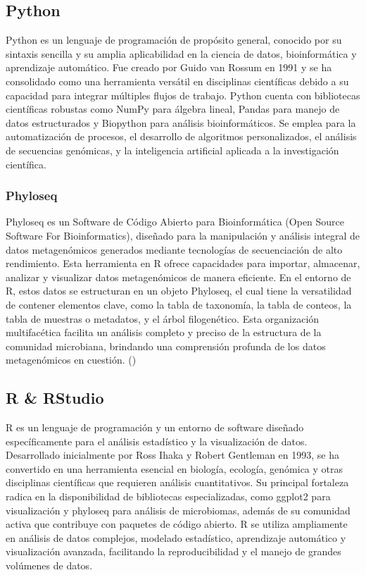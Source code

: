 \subsection{Python}
Python es un lenguaje de programación de propósito general, conocido por su sintaxis sencilla y su amplia aplicabilidad en la ciencia de datos, bioinformática y aprendizaje automático. Fue creado por Guido van Rossum en 1991 y se ha consolidado como una herramienta versátil en disciplinas científicas debido a su capacidad para integrar múltiples flujos de trabajo. Python cuenta con bibliotecas científicas robustas como NumPy para álgebra lineal, Pandas para manejo de datos estructurados y Biopython para análisis bioinformáticos. Se emplea para la automatización de procesos, el desarrollo de algoritmos personalizados, el análisis de secuencias genómicas, y la inteligencia artificial aplicada a la investigación científica.\\

\subsubsection{Phyloseq}
Phyloseq es un Software de Código Abierto para Bioinformática (Open Source Software For Bioinformatics), diseñado para la manipulación y análisis integral de datos metagenómicos generados mediante tecnologías de secuenciación de alto rendimiento. Esta herramienta en R ofrece capacidades para importar, almacenar, analizar y visualizar datos metagenómicos de manera eficiente. En el entorno de R, estos datos se estructuran en un objeto Phyloseq, el cual tiene la versatilidad de contener elementos clave, como la tabla de taxonomía, la tabla de conteos, la tabla de muestras o metadatos, y el árbol filogenético. Esta organización multifacética facilita un análisis completo y preciso de la estructura de la comunidad microbiana, brindando una comprensión profunda de los datos metagenómicos en cuestión. (\cite{mcmurdie2013})\\

\subsection{R \& RStudio}
R es un lenguaje de programación y un entorno de software diseñado específicamente para el análisis estadístico y la visualización de datos. Desarrollado inicialmente por Ross Ihaka y Robert Gentleman en 1993, se ha convertido en una herramienta esencial en biología, ecología, genómica y otras disciplinas científicas que requieren análisis cuantitativos. Su principal fortaleza radica en la disponibilidad de bibliotecas especializadas, como ggplot2 para visualización y phyloseq para análisis de microbiomas, además de su comunidad activa que contribuye con paquetes de código abierto. R se utiliza ampliamente en análisis de datos complejos, modelado estadístico, aprendizaje automático y visualización avanzada, facilitando la reproducibilidad y el manejo de grandes volúmenes de datos.\\

